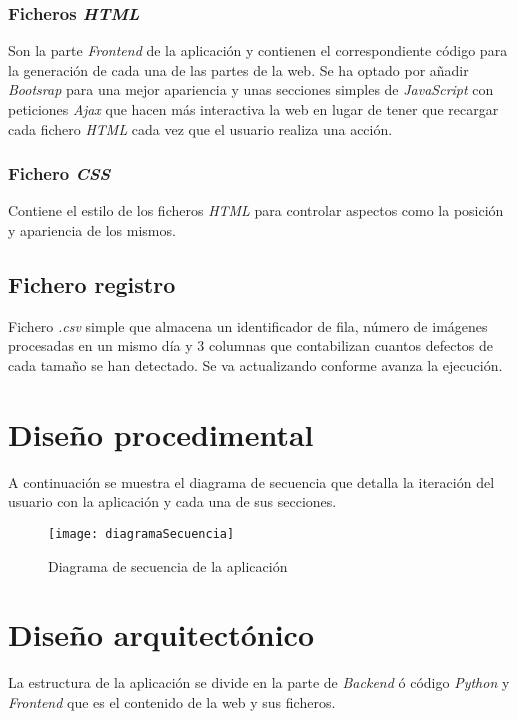 \subsubsection{Ficheros \emph{HTML}}
Son la parte \emph{Frontend} de la aplicación y contienen el correspondiente código para la generación de cada una de las partes de la web.
Se ha optado por añadir \emph{Bootsrap} para una mejor apariencia y unas secciones simples de \emph{JavaScript} con peticiones \emph{Ajax} que hacen más interactiva la web en lugar de tener que recargar cada fichero \emph{HTML} cada vez que el usuario realiza una acción.

\subsubsection{Fichero \emph{CSS}}
Contiene el estilo de los ficheros \emph{HTML} para controlar aspectos como la posición y apariencia de los mismos.

\subsection{Fichero registro} 
Fichero \emph{.csv} simple que almacena un identificador de fila, número de imágenes procesadas en un mismo día y 3 columnas que contabilizan cuantos defectos de cada tamaño se han detectado. Se va actualizando conforme avanza la ejecución.

\section{Diseño procedimental}

A continuación se muestra el diagrama de secuencia que detalla la iteración del usuario con la aplicación y cada una de sus secciones.

\begin{figure}[htb]
	\centering
	\texttt{[image: diagramaSecuencia]}
	\caption[Diagrama de secuencia de la aplicación]{Diagrama de secuencia de la aplicación}
\end{figure}

\clearpage

\section{Diseño arquitectónico}

La estructura de la aplicación se divide en la parte de \emph{Backend} ó código \emph{Python} y \emph{Frontend} que es el contenido de la web y sus ficheros.

